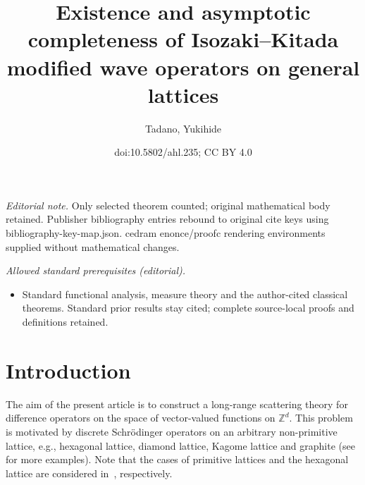 \documentclass[10pt]{amsart}
\title{Existence and asymptotic completeness of Isozaki--Kitada modified wave operators on general lattices}
\author{Tadano, Yukihide}
\date{doi:10.5802/ahl.235; CC BY 4.0}
\theoremstyle{definition}\newtheorem{defi}[theo]{Definition}\newtheorem{rema}[theo]{Remark}\newtheorem{exam}[theo]{Example}\newtheorem{exem}[theo]{Example}\newtheorem{nota}[theo]{Notation}
\newcommand{\Z}{\mathbb{Z}}
\begin{document}
\maketitle
\noindent\textit{Editorial note.} Only selected theorem counted; original mathematical body retained. Publisher bibliography entries rebound to original cite keys using bibliography-key-map.json. cedram enonce/proofc rendering environments supplied without mathematical changes.\par\medskip
\noindent\textit{Allowed standard prerequisites (editorial).}\begin{itemize}
\item Standard functional analysis, measure theory and the author-cited classical theorems. Standard prior results stay cited; complete source-local proofs and definitions retained.
\end{itemize}\medskip

\section{Introduction}

The aim of the present article is to construct a long-range scattering theory for difference operators on the space of vector-valued functions on $\Z^d$. This problem is motivated by discrete Schr\"odinger operators on an arbitrary non-primitive lattice, e.g., hexagonal lattice, diamond lattice, Kagome lattice and graphite (see~\cite{An-I-M} for more examples). Note that the cases of primitive lattices and the hexagonal lattice are considered in~\cite{T1,T2}, respectively.
\end{document}
